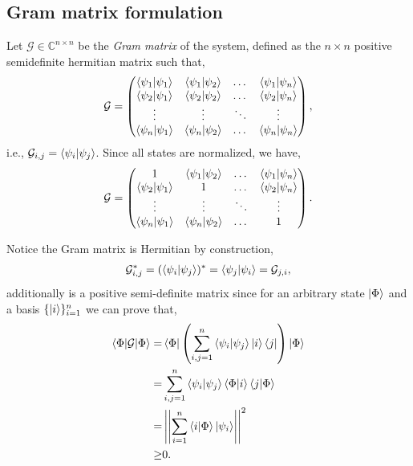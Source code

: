 \documentclass[12pt,letterpaper]{article}
\begin{document}
\begin{multicols}{2}
\subsection{Gram matrix formulation}\label{sectionGramMatrixFormulation}
Let $\mathcal{G} \in \mathbb{C}^{n \times n}$ be the \emph{Gram matrix} of the system, defined as the $n\times n$ positive semidefinite hermitian matrix such that,
\begin{equation*}
	\mathcal{G} =
	\begin{pmatrix}
		\braket{\psi_1|\psi_1} & \braket{\psi_1|\psi_2} & \dots & \braket{\psi_1|\psi_n}\\
		\braket{\psi_2|\psi_1} & \braket{\psi_2|\psi_2} & \dots & \braket{\psi_2|\psi_n}\\
		\vdots & \vdots & \ddots & \vdots\\
		\braket{\psi_n|\psi_1} & \braket{\psi_n|\psi_2} & \dots & \braket{\psi_n|\psi_n}
	\end{pmatrix},
\end{equation*}
i.e., $\mathcal{G}_{i,j} = \braket{\psi_i|\psi_j}$. Since all states are normalized, we have,
\begin{equation*}
	\mathcal{G} =
	\begin{pmatrix}
		1 & \braket{\psi_1|\psi_2} & \dots & \braket{\psi_1|\psi_n}\\
		\braket{\psi_2|\psi_1} & 1 & \dots & \braket{\psi_2|\psi_n}\\
		\vdots & \vdots & \ddots & \vdots\\
		\braket{\psi_n|\psi_1} & \braket{\psi_n|\psi_2} & \dots & 1
	\end{pmatrix}.
\end{equation*}

Notice the Gram matrix is Hermitian by construction,
\begin{align*}
\mathcal{G}_{i,j}^* = (\braket{\psi_i|\psi_j})^* = \braket{\psi_j|\psi_i} = \mathcal{G}_{j,i},
\end{align*}
additionally is a positive semi-definite matrix since for an arbitrary state $\ket{\Phi}$ and a basis $\{\ket{i}\}_{i=1}^n$ we can prove that,
\begin{align*}
	\braket{\Phi|\mathcal{G}|\Phi} =& \braket{\Phi|\left(\sum_{i,j=1}^{n}\braket{\psi_i|\psi_j}\ket{i}\bra{j}\right)|\Phi} \\
	=& \sum_{i,j=1}^{n}\braket{\psi_i|\psi_j}\braket{\Phi|i}\braket{j|\Phi}\\
	=& \left|\left|\sum_{i=1}^{n}\braket{i|\Phi} \ket{\psi_i}\right|\right|^2\\
	\geq& 0.
\end{align*}



\end{multicols}
\end{document}
